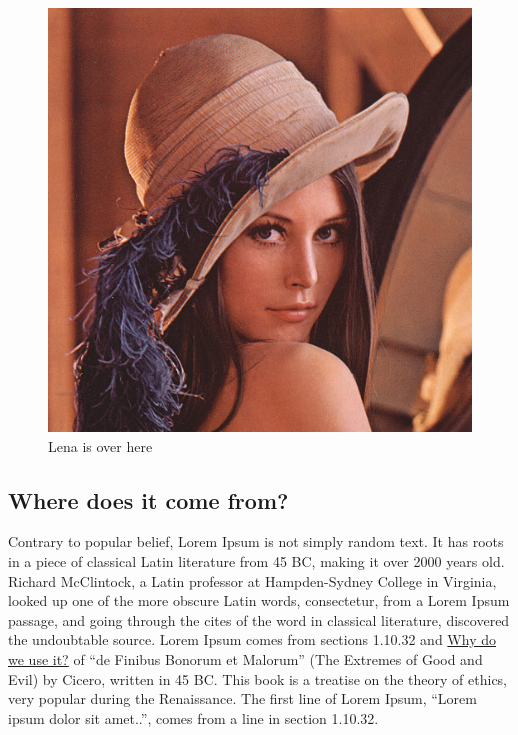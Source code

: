 \documentclass[conference,8pt,portuguese,]{IEEEtran}
\begin{document}
\begin{figure}
\centering
\includegraphics{lena.png}
\caption{Lena is over here \label{lena}}
\end{figure}

\hypertarget{where-does-it-come-from}{%
\subsection{Where does it come from?}\label{where-does-it-come-from}}

Contrary to popular belief, Lorem Ipsum is not simply random text. It
has roots in a piece of classical Latin literature from 45 BC, making it
over 2000 years old. Richard McClintock, a Latin professor at
Hampden-Sydney College in Virginia, looked up one of the more obscure
Latin words, consectetur, from a Lorem Ipsum passage, and going through
the cites of the word in classical literature, discovered the
undoubtable source. Lorem Ipsum comes from sections 1.10.32 and
\protect\hyperlink{why-do-we-use-it}{Why do we use it?} of ``de Finibus
Bonorum et Malorum'' (The Extremes of Good and Evil) by Cicero, written
in 45 BC. This book is a treatise on the theory of ethics, very popular
during the Renaissance. The first line of Lorem Ipsum, ``Lorem ipsum
dolor sit amet..'', comes from a line in section 1.10.32.
\end{document}
